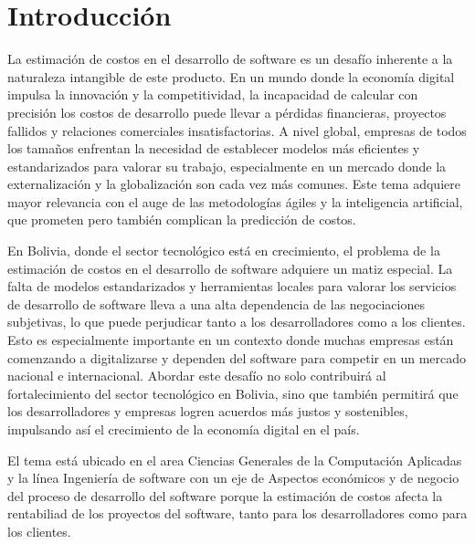 \chapter*{Introducción}

La estimación de costos en el desarrollo de software es un desafío inherente a la naturaleza intangible de este producto. En un mundo donde la economía digital impulsa la innovación y la competitividad, la incapacidad de calcular con precisión los costos de desarrollo puede llevar a pérdidas financieras, proyectos fallidos y relaciones comerciales insatisfactorias. A nivel global, empresas de todos los tamaños enfrentan la necesidad de establecer modelos más eficientes y estandarizados para valorar su trabajo, especialmente en un mercado donde la externalización y la globalización son cada vez más comunes. Este tema adquiere mayor relevancia 
con el auge de las metodologías ágiles y la inteligencia artificial, que prometen pero también complican la predicción de costos.

En Bolivia, donde el sector tecnológico está en crecimiento, el problema de la estimación de costos en el desarrollo de software adquiere un matiz especial. La falta de modelos estandarizados y herramientas locales para valorar los servicios de desarrollo de software lleva a una alta dependencia de las negociaciones subjetivas, lo que puede perjudicar tanto a los desarrolladores como a los clientes. Esto es especialmente importante en un contexto donde muchas empresas están comenzando a digitalizarse y dependen del software para competir en un mercado nacional e internacional. Abordar este desafío no solo contribuirá al fortalecimiento del sector tecnológico en Bolivia, sino que también permitirá que los desarrolladores y empresas logren acuerdos más justos y sostenibles, impulsando así el crecimiento de la economía digital en el país.

El tema está ubicado en el area 
Ciencias Generales de la Computación Aplicadas y la 
línea Ingeniería de software con un eje de 
Aspectos económicos y de negocio del proceso de desarrollo del software porque la estimación de costos afecta la 
rentabiliad de los proyectos del software, tanto para los desarrolladores
como para los clientes.